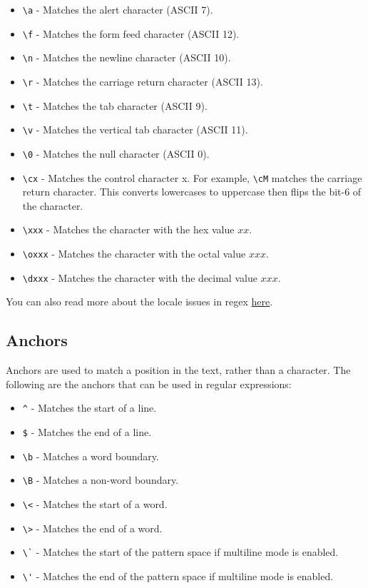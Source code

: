 \begin{itemize}
  \item \lstinline|\a| - Matches the alert character (ASCII 7).
  \item \lstinline|\f| - Matches the form feed character (ASCII 12).
  \item \lstinline|\n| - Matches the newline character (ASCII 10).
  \item \lstinline|\r| - Matches the carriage return character (ASCII 13).
  \item \lstinline|\t| - Matches the tab character (ASCII 9).
  \item \lstinline|\v| - Matches the vertical tab character (ASCII 11).
  \item \lstinline|\0| - Matches the null character (ASCII 0).
  \item \lstinline|\cx| - Matches the control character x. For example, \lstinline|\cM| matches the carriage return character. This converts lowercases to uppercase then flips the bit-6 of the character.
  \item \lstinline|\xxx| - Matches the character with the hex value $xx$.
  \item \lstinline|\oxxx| - Matches the character with the octal value $xxx$.
  \item \lstinline|\dxxx| - Matches the character with the decimal value $xxx$.
\end{itemize}

You can also read more about the locale issues in regex
\href{https://www.gnu.org/software/sed/manual/html\_node/Locale-Considerations.html#Locale-Considerations}{here}.

\subsection{Anchors}

Anchors are used to match a position in the text, rather than a character. The following are the anchors that can be used in regular expressions:

\begin{itemize}
  \item \lstinline|^| - Matches the start of a line.
  \item \lstinline|$| - Matches the end of a line.
  \item \lstinline|\b| - Matches a word boundary.
  \item \lstinline|\B| - Matches a non-word boundary.
  \item \lstinline|\<| - Matches the start of a word.
  \item \lstinline|\>| - Matches the end of a word.
  \item \lstinline|\`| - Matches the start of the pattern space if multiline mode is enabled.
    \item \lstinline|\'| - Matches the end of the pattern space if multiline mode is enabled.
\end{itemize}

